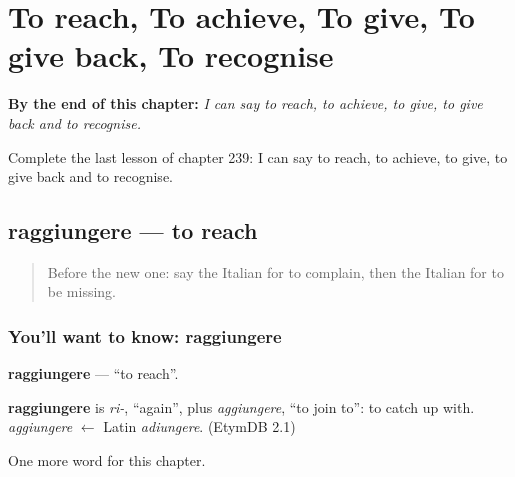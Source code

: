 
\chapter{To reach, To achieve, To give, To give back, To recognise}
\label{ch:it-to-reach-to-achieve-to-give-to-give-back-to-recognise}

\begin{chapteropening}
\textbf{By the end of this chapter:} \emph{I can say to reach, to achieve, to give, to give back and to recognise.}

Complete the last lesson of chapter 239: I can say to reach, to achieve, to give, to give back and to recognise.
\end{chapteropening}

\section[raggiungere]{raggiungere — to reach}

\label{lesson:IT-C239-raggiungere}



\begin{quote}
Before the new one: say the Italian for to complain, then the Italian for to be missing.
\end{quote}

\subsection*{You'll want to know: raggiungere}
\textbf{raggiungere} — \textquotedblleft{}to reach\textquotedblright{}.

\begin{cousinweb}
\textbf{raggiungere} is \emph{ri-}, \textquotedblleft{}again\textquotedblright{}, plus \emph{aggiungere}, \textquotedblleft{}to join to\textquotedblright{}: to catch up with. \emph{aggiungere} $\leftarrow$ Latin \emph{adiungere}. (EtymDB 2.1)
\end{cousinweb}

\begin{grammarlens}[title={What you've built}]
One more word for this chapter.
\end{grammarlens}

